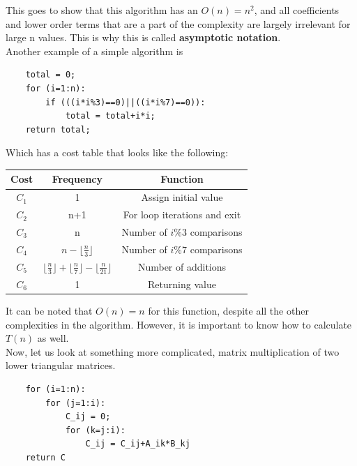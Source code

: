 \documentclass[nobib]{tufte-handout}
\begin{document}
This goes to show that this algorithm has an $O(n) = n^2$, and all coefficients and lower order terms that are a part of the complexity are largely irrelevant for large n values.
This is why this is called \textbf{asymptotic notation}.\\
Another example of a simple algorithm is
\begin{lstlisting}
    total = 0;
    for (i=1:n):
        if (((i*i%3)==0)||((i*i%7)==0)):
            total = total+i*i;
    return total;
\end{lstlisting}
Which has a cost table that looks like the following:\\
\begin{table}
    \centering
    \begin{tabular}{c|c|c}
        Cost  & Frequency                                                                                  & Function                     \\
        \hline
        $C_1$ & 1                                                                                          & Assign initial value         \\
        $C_2$ & n+1                                                                                        & For loop iterations and exit \\
        $C_3$ & n                                                                                          & Number of $i\%3$ comparisons \\
        $C_4$ & $n - \lfloor \frac{n}{3} \rfloor  $                                                        & Number of $i\%7$ comparisons \\
        $C_5$ & $\lfloor \frac{n}{3} \rfloor + \lfloor \frac{n}{7} \rfloor - \lfloor \frac{n}{21} \rfloor$ & Number of additions          \\
        $C_6$ & 1                                                                                          & Returning value              \\
    \end{tabular}
\end{table}
It can be noted that $O(n) = n$ for this function, despite all the other complexities in the algorithm. However, it is important to know how to calculate $T(n)$ as well.\\
Now, let us look at something more complicated, matrix multiplication of two lower triangular matrices.
\begin{lstlisting}
    for (i=1:n):
        for (j=1:i):
            C_ij = 0;
            for (k=j:i):
                C_ij = C_ij+A_ik*B_kj
    return C
\end{lstlisting}
\end{document}
